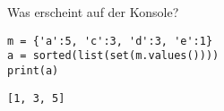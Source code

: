 \question[2] Was erscheint auf der Konsole?
\begin{lstlisting}
m = {'a':5, 'c':3, 'd':3, 'e':1}
a = sorted(list(set(m.values())))
print(a)
\end{lstlisting}
\begin{solutionbox}{2cm}
\begin{lstlisting}
[1, 3, 5]
\end{lstlisting}
\end{solutionbox}
